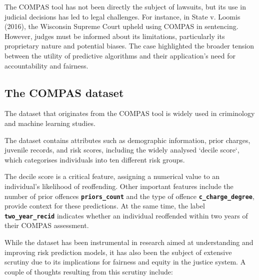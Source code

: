 \documentclass[conference]{IEEEtran}
\begin{document}
	The COMPAS tool has not been directly the subject of lawsuits, but its use in judicial decisions has led to legal challenges. For instance, in State v. Loomis (2016), the Wisconsin Supreme Court upheld using COMPAS in sentencing. However, judges must be informed about its limitations, particularly its proprietary nature and potential biases. The case highlighted the broader tension between the utility of predictive algorithms and their application's need for accountability and fairness.
	
	\subsection{The COMPAS dataset}
	
	The dataset that originates from the COMPAS tool is widely used in criminology and machine learning studies. 
	
	The dataset contains attributes such as demographic information, prior charges, juvenile records, and risk scores, including the widely analysed `decile score`, which categorises individuals into ten different risk groups. 
	
	The decile score is a critical feature, assigning a numerical value to an individual's likelihood of reoffending. Other important features include the number of prior offences \textbf{\texttt{priors\_count}} and the type of offence \textbf{\texttt{c\_charge\_degree}}, provide context for these predictions. At the same time, the label \textbf{\texttt{two\_year\_recid}} indicates whether an individual reoffended within two years of their COMPAS assessment.
	
	While the dataset has been instrumental in research aimed at understanding and improving risk prediction models, it has also been the subject of extensive scrutiny due to its implications for fairness and equity in the justice system. A couple of thoughts resulting from this scrutiny include:
	
\end{document}
